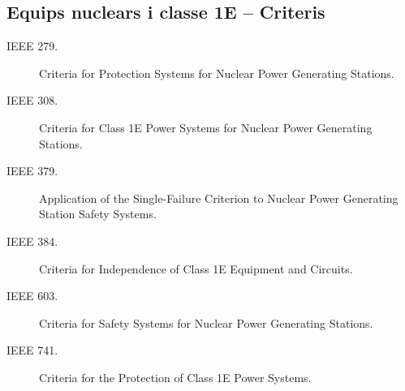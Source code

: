 \subsection*{Equips nuclears i classe 1E -- Criteris} 
\begin{description}
    \item [\hspace{5mm}IEEE 279.] Criteria for Protection Systems for Nuclear Power Generating Stations.
    \item [\hspace{5mm}IEEE 308.] Criteria for Class 1E Power Systems for Nuclear Power Generating Stations.
    \item [\hspace{5mm}IEEE 379.] Application of the Single-Failure Criterion to Nuclear Power Generating Station Safety Systems.
    \item [\hspace{5mm}IEEE 384.] Criteria for Independence of Class 1E Equipment and Circuits.
    \item [\hspace{5mm}IEEE 603.] Criteria for Safety Systems for Nuclear Power Generating Stations.
    \item [\hspace{5mm}IEEE 741.] Criteria for the Protection of Class 1E Power Systems.
\end{description}


